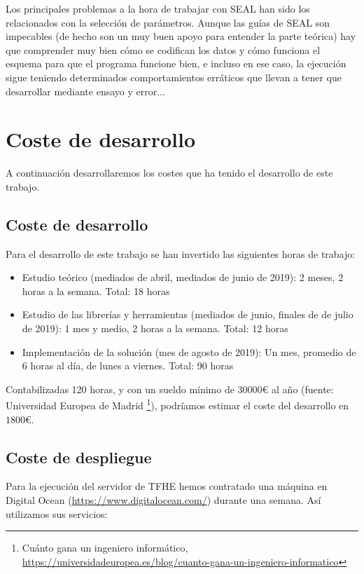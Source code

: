 Los principales problemas a la hora de trabajar con SEAL han sido los relacionados con la selección de parámetros. Aunque las guías de SEAL son impecables (de hecho son un muy buen apoyo para entender la parte teórica) hay que comprender muy bien cómo se codifican los datos y cómo funciona el esquema para que el programa funcione bien, e incluso en ese caso, la ejecución sigue teniendo determinados comportamientos erráticos que llevan a tener que desarrollar mediante ensayo y error...

\section{Coste de desarrollo}

A continuación desarrollaremos los costes que ha tenido el desarrollo de este trabajo.

\subsection{Coste de desarrollo}

Para el desarrollo de este trabajo se han invertido las siguientes horas de trabajo:

\begin{itemize}
    \item Estudio teórico (mediados de abril, mediados de junio de 2019): 2 meses, 2 horas a la semana. Total: 18 horas
    \item Estudio de las librerías y herramientas (mediados de junio, finales de de julio de 2019): 1 mes y medio, 2 horas a la semana. Total: 12 horas
    \item Implementación de la solución (mes de agosto de 2019): Un mes, promedio de 6 horas al día, de lunes a viernes. Total: 90 horas
\end{itemize}

Contabilizadas 120 horas, y con un sueldo mínimo de $30000$\euro{} al año (fuente: Universidad Europea de Madrid \footnote{Cuánto gana un ingeniero informático, \url{https://universidadeuropea.es/blog/cuanto-gana-un-ingeniero-informatico}}), podríamos estimar el coste del desarrollo en $1800$\euro{}.

\subsection{Coste de despliegue}

Para la ejecución del servidor de TFHE hemos contratado una máquina en Digital Ocean (\url{https://www.digitalocean.com/}) durante una semana. Así utilizamos sus servicios:

